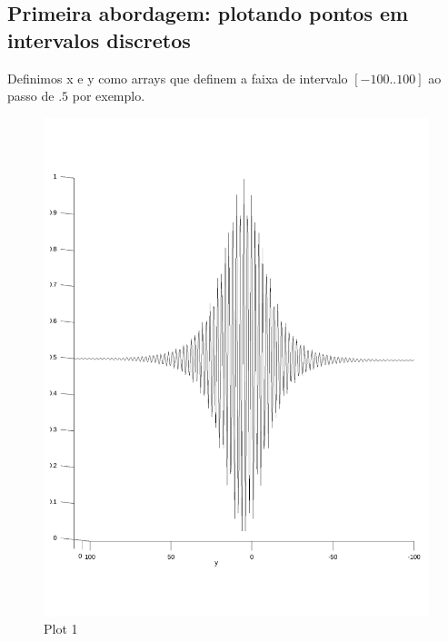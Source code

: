 \documentclass{article}
\begin{document}
\subsection*{Primeira abordagem: plotando pontos em intervalos discretos}

Definimos x e y como arrays que definem a faixa de intervalo $[-100..100]$ ao passo de $.5$ por exemplo.




\newpage
\begin{figure}[h!]
\centering
\includegraphics[scale=.5]{myplot1.pdf}
\caption{Plot 1}
\label{fig:plot1_f6}
\end{figure}
\end{document}
